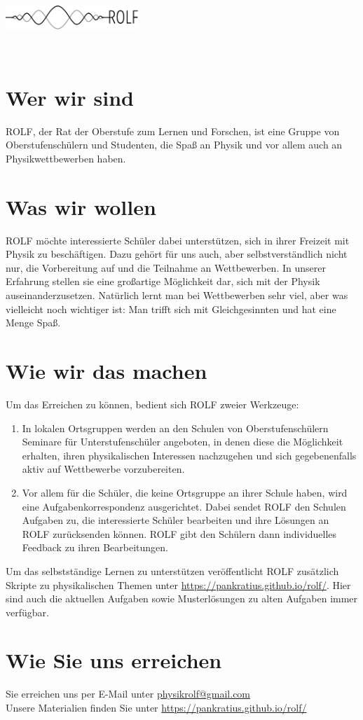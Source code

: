\documentclass[a4paper]{article}
\begin{document}
	\vspace*{-1cm}
	\parbox{4cm}{\vspace{-0.2cm}\includegraphics[width=5cm]{../task/images/logo_scaled.pdf}}
	\parbox{12.5cm}{ }\\
		\vspace{0.5cm}

\thispagestyle{empty}


\noindent

\section*{Wer wir sind}
ROLF, der Rat der Oberstufe zum Lernen und Forschen, ist eine Gruppe von Oberstufenschülern und Studenten, die Spaß an Physik und vor allem auch an Physikwettbewerben haben.

\section*{Was wir wollen}
ROLF möchte interessierte Schüler dabei unterstützen, sich in ihrer Freizeit mit Physik zu beschäftigen. Dazu gehört für uns auch, aber selbstverständlich nicht nur, die Vorbereitung auf und die Teilnahme an Wettbewerben. In unserer Erfahrung stellen sie eine großartige Möglichkeit dar, sich mit der Physik auseinanderzusetzen. Natürlich lernt man bei Wettbewerben sehr viel, aber was vielleicht noch wichtiger ist: Man trifft sich mit Gleichgesinnten und hat eine Menge Spaß.  

\section*{Wie wir das machen}
Um das Erreichen zu können, bedient sich ROLF zweier Werkzeuge:
\begin{enumerate}
\item In lokalen Ortsgruppen werden an den Schulen von Oberstufenschülern Seminare für Unterstufenschüler angeboten, in denen diese die Möglichkeit erhalten, ihren physikalischen Interessen nachzugehen und sich gegebenenfalls aktiv auf Wettbewerbe vorzubereiten.
\item Vor allem für die Schüler, die keine Ortsgruppe an ihrer Schule haben, wird eine Aufgabenkorrespondenz ausgerichtet. Dabei sendet ROLF den Schulen Aufgaben zu, die interessierte Schüler bearbeiten und ihre Lösungen an ROLF zurücksenden können. ROLF gibt den Schülern dann individuelles Feedback zu ihren Bearbeitungen.   
\end{enumerate}
Um das selbstständige Lernen zu unterstützen veröffentlicht ROLF zusätzlich Skripte zu physikalischen Themen unter \url{https://pankratius.github.io/rolf/}. Hier sind auch die aktuellen Aufgaben sowie Musterlösungen zu alten Aufgaben immer verfügbar.

\section*{Wie Sie uns erreichen}
Sie erreichen uns per E-Mail unter \url{physikrolf@gmail.com}\\
Unsere Materialien finden Sie unter \url{https://pankratius.github.io/rolf/}     
\end{document}
